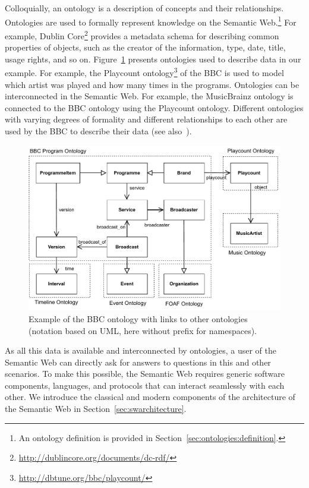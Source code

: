 \documentclass[a4paper,USenglish]{tgdk-v2021}
\newcommand{\myurl}[1]{\footnote{\url{#1}}}
\begin{document}
Colloquially, an ontology is a description of concepts and their relationships.
Ontologies are used to formally represent knowledge on the Semantic Web.\footnote{An ontology definition is provided in Section~\ref{sec:ontologies:definition}.}
For example, Dublin Core\myurl{http://dublincore.org/documents/dc-rdf/} provides a metadata schema for describing common properties of objects, such as the creator of the information, type, date, title, usage rights, and so on.
Figure~\ref{fig:bbc-ontology-example} presents ontologies used to describe data in our example.
For example, the Playcount ontology\myurl{http://dbtune.org/bbc/playcount/} of the BBC is used to model which artist was played and how many times in the programs.
Ontologies can be interconnected in the Semantic Web.
For example, the MusicBrainz ontology is connected to the BBC ontology using the Playcount ontology.
Different ontologies with varying degrees of formality and different relationships to each other are used by the BBC to describe their data (see also~\cite{Raimond2009IMR}).

\begin{figure}[ht]
  \centering
   \includegraphics[scale=0.7]{figs/bbc-ontology-example-en}
   \caption{Example of the BBC ontology with links to other ontologies (notation based on UML, here without prefix for namespaces).}
   \label{fig:bbc-ontology-example}
\end{figure}

As all this data is available and interconnected by ontologies, a user of the Semantic Web can directly ask for answers to questions in this and other scenarios.
To make this possible, the Semantic Web requires generic software components, languages, and protocols that can interact seamlessly with each other.
We introduce the classical and modern components of the architecture of the Semantic Web in Section~\ref{sec:swarchitecture}.
\end{document}

